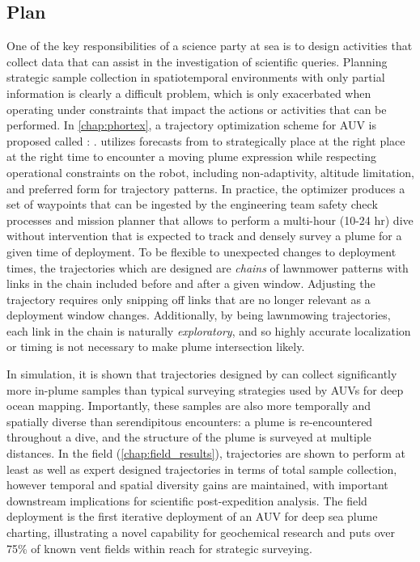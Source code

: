 \subsection{Plan}
One of the key responsibilities of a science party at sea is to design activities that collect data that can assist in the investigation of scientific queries.
Planning strategic sample collection in spatiotemporal environments with only partial information is clearly a difficult problem, which is only exacerbated when operating under constraints that impact the actions or activities that can be performed.
In \cref{chap:phortex}, a trajectory optimization scheme for AUV \Sentry is proposed called \PHORTEX: \phortex.
\PHORTEX utilizes forecasts from \PHUMES to strategically place \Sentry at the right place at the right time to encounter a moving plume expression while respecting operational constraints on the robot, including non-adaptivity, altitude limitation, and preferred form for trajectory patterns.
In practice, the optimizer produces a set of waypoints that can be ingested by the \Sentry engineering team safety check processes and \Sentry mission planner that allows \Sentry to perform a multi-hour (10-24 hr) dive without intervention that is expected to track and densely survey a plume for a given time of deployment.
To be flexible to unexpected changes to deployment times, the trajectories which are designed are \emph{chains} of lawnmower patterns with links in the chain included before and after a given window.
Adjusting the trajectory requires only snipping off links that are no longer relevant as a deployment window changes.
Additionally, by being lawnmowing trajectories, each link in the chain is naturally \emph{exploratory}, and so highly accurate localization or timing is not necessary to make plume intersection likely.

In simulation, it is shown that trajectories designed by \PHORTEX can collect significantly more in-plume samples than typical surveying strategies used by AUVs for deep ocean mapping.
Importantly, these samples are also more temporally and spatially diverse than serendipitous encounters: a plume is re-encountered throughout a dive, and the structure of the plume is surveyed at multiple distances.
In the field (\cref{chap:field_results}), \PHORTEX trajectories are shown to perform at least as well as expert designed trajectories in terms of total sample collection, however temporal and spatial diversity gains are maintained, with important downstream implications for scientific post-expedition analysis.
The field deployment is the first iterative deployment of an AUV for deep sea plume charting, illustrating a novel capability for geochemical research and puts over 75\% of known vent fields\autocite{beaulieu2013authoritative} within reach for strategic surveying.


